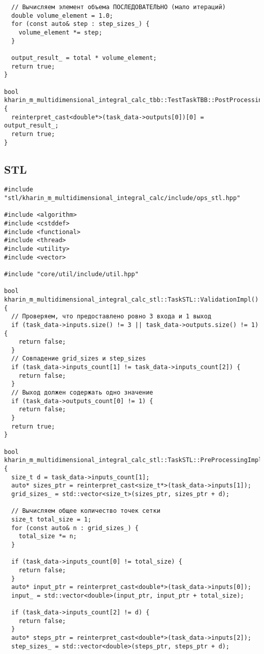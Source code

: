 \documentclass[12pt]{article}
\begin{document}
\begin{lstlisting}
  // Вычисляем элемент объема ПОСЛЕДОВАТЕЛЬНО (мало итераций)
  double volume_element = 1.0;
  for (const auto& step : step_sizes_) {
    volume_element *= step;
  }

  output_result_ = total * volume_element;
  return true;
}

bool kharin_m_multidimensional_integral_calc_tbb::TestTaskTBB::PostProcessingImpl() {
  reinterpret_cast<double*>(task_data->outputs[0])[0] = output_result_;
  return true;
}
\end{lstlisting}

\subsection*{STL}
\begin{lstlisting}
#include "stl/kharin_m_multidimensional_integral_calc/include/ops_stl.hpp"

#include <algorithm>
#include <cstddef>
#include <functional>
#include <thread>
#include <utility>
#include <vector>

#include "core/util/include/util.hpp"

bool kharin_m_multidimensional_integral_calc_stl::TaskSTL::ValidationImpl() {
  // Проверяем, что предоставлено ровно 3 входа и 1 выход
  if (task_data->inputs.size() != 3 || task_data->outputs.size() != 1) {
    return false;
  }
  // Совпадение grid_sizes и step_sizes
  if (task_data->inputs_count[1] != task_data->inputs_count[2]) {
    return false;
  }
  // Выход должен содержать одно значение
  if (task_data->outputs_count[0] != 1) {
    return false;
  }
  return true;
}

bool kharin_m_multidimensional_integral_calc_stl::TaskSTL::PreProcessingImpl() {
  size_t d = task_data->inputs_count[1];
  auto* sizes_ptr = reinterpret_cast<size_t*>(task_data->inputs[1]);
  grid_sizes_ = std::vector<size_t>(sizes_ptr, sizes_ptr + d);

  // Вычисляем общее количество точек сетки
  size_t total_size = 1;
  for (const auto& n : grid_sizes_) {
    total_size *= n;
  }

  if (task_data->inputs_count[0] != total_size) {
    return false;
  }
  auto* input_ptr = reinterpret_cast<double*>(task_data->inputs[0]);
  input_ = std::vector<double>(input_ptr, input_ptr + total_size);

  if (task_data->inputs_count[2] != d) {
    return false;
  }
  auto* steps_ptr = reinterpret_cast<double*>(task_data->inputs[2]);
  step_sizes_ = std::vector<double>(steps_ptr, steps_ptr + d);


\end{lstlisting}
\end{document}
